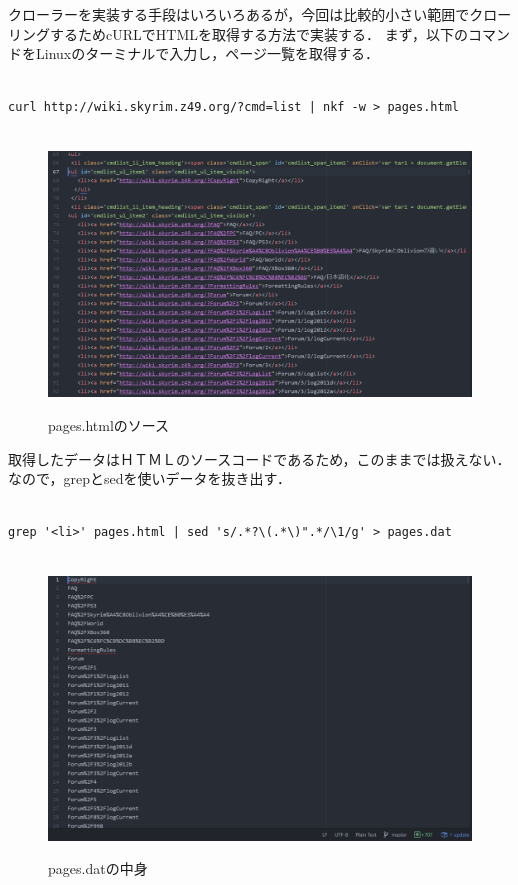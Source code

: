 クローラーを実装する手段はいろいろあるが，今回は比較的小さい範囲でクローリングするためcURLでHTMLを取得する方法で実装する．
まず，以下のコマンドをLinuxのターミナルで入力し，ページ一覧を取得する．

\begin{verbatim}

curl http://wiki.skyrim.z49.org/?cmd=list | nkf -w > pages.html

\end{verbatim}

\begin{figure}[htbp]
\centering　
\includegraphics[width=13cm]{pageshtml.png}
\caption{pages.htmlのソース}
\end{figure}

取得したデータはＨＴＭＬのソースコードであるため，このままでは扱えない．なので，grepとsedを使いデータを抜き出す．

\begin{verbatim}

grep '<li>' pages.html | sed 's/.*?\(.*\)".*/\1/g' > pages.dat

\end{verbatim}


\begin{figure}[htbp]
\centering　
\includegraphics[width=13cm]{pagedat.png}
\caption{pages.datの中身}
\end{figure}

